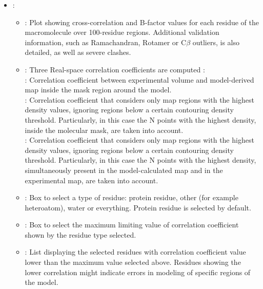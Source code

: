 \begin{itemize}
\begin{itemize}
\begin{itemize}
         \item {}: 
         \begin{itemize}
          \item {}: Plot showing cross-correlation and B-factor values for each residue of the macromolecule over 100-residue regions. Additional validation information, such as Ramachandran, Rotamer or C{$\beta$} outliers, is also detailed, as well as severe clashes.  
          \item {}: Three Real-space correlation coefficients are computed \citep{afonine2018b}: \setlength{\parindent}{12pt}\\
          
           : Correlation coefficient between experimental volume and model-derived map inside the mask region around the model.\\
           
           : Correlation coefficient that considers only map regions with the highest density values, ignoring regions below a certain contouring density threshold. Particularly, in this case the N points with the highest density, inside the molecular mask, are taken into account.\\
           
           : Correlation coefficient that considers only map regions with the highest density values, ignoring regions below a certain contouring density threshold. Particularly, in this case the N points with the highest density, simultaneously present in the model-calculated map and in the experimental map, are taken into account.\\

          \item {}: Box to select a type of residue: protein residue, other (for example heteroatom), water or everything. Protein residue is selected by default.
          \item {}: Box to select the maximum limiting value of correlation coefficient shown by the residue type selected. 
          \item {}: List displaying the selected residues with correlation coefficient value lower than the maximum value selected above. Residues showing the lower correlation might indicate errors in modeling of specific regions of the model.
         \end{itemize}
         

\end{itemize}
\end{itemize}
\end{itemize}
